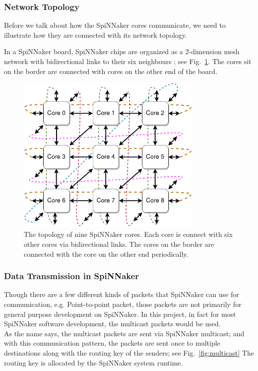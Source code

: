 \subsubsection{Network Topology}
Before we talk about how the SpiNNaker cores communicate, we need to illustrate how they are connected with its network topology.

In a SpiNNaker board, SpiNNaker chips are organized as a 2-dimension mesh network with bidirectional links to their six neighbours \cite{testchip}; see Fig.~\ref{fig:topology}. The cores sit on the border are connected with cores on the other end of the board.

\begin{figure}[!tb]
   \centering
       \includegraphics[width=0.8\textwidth]{figures/topology.png}
       \caption{The topology of nine SpiNNaker cores. Each core is connect with six other cores via bidirectional links. The cores on the border are connected with the core on the other end periodically.}
       \label{fig:topology}
\end{figure}

\subsubsection{Data Transmission in SpiNNaker} \label{sec:dt}
Though there are a few different kinds of packets that SpiNNaker can use for communication, e.g. Point-to-point packet, those packets are not primarily for general purpose development on SpiNNaker. In this project, in fact for most SpiNNaker software development, the multicast packets would be used.\\

As the name says, the multicast packets are sent via SpiNNaker multicast; and with this communication pattern, the packets are sent once to multiple destinations along with the routing key of the senders; see Fig.~\ref{fig:multicast} The routing key is allocated by the SpiNNaker system runtime. \\

